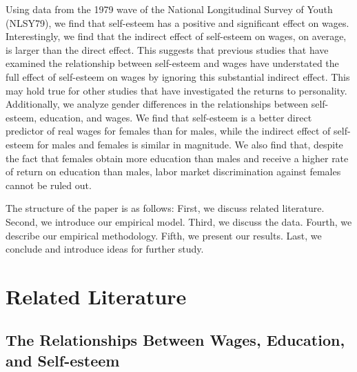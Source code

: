 \documentclass[12pt]{report}
\begin{document}
Using data from the 1979 wave of the National Longitudinal Survey of Youth (NLSY79), we find that self-esteem has a positive and significant effect on wages. Interestingly, we find that the indirect effect of self-esteem on wages, on average, is larger than the direct effect. This suggests that previous studies that have examined the relationship between self-esteem and wages have understated the full effect of self-esteem on wages by ignoring this substantial indirect effect. This may hold true for other studies that have investigated the returns to personality. Additionally, we analyze gender differences in the relationships between self-esteem, education, and wages. We find that self-esteem is a better direct predictor of real wages for females than for males, while the indirect effect of self-esteem for males and females is similar in magnitude. We also find that, despite the fact that females obtain more education than males and receive a higher rate of return on education than males, labor market discrimination against females cannot be ruled out.

The structure of the paper is as follows: First, we discuss related literature. Second, we introduce our empirical model. Third, we discuss the data. Fourth, we describe our empirical methodology. Fifth, we present our results. Last, we conclude and introduce ideas for further study.

\chapter{Related Literature}

\section*{The Relationships Between Wages, Education, and Self-esteem}
\end{document}
